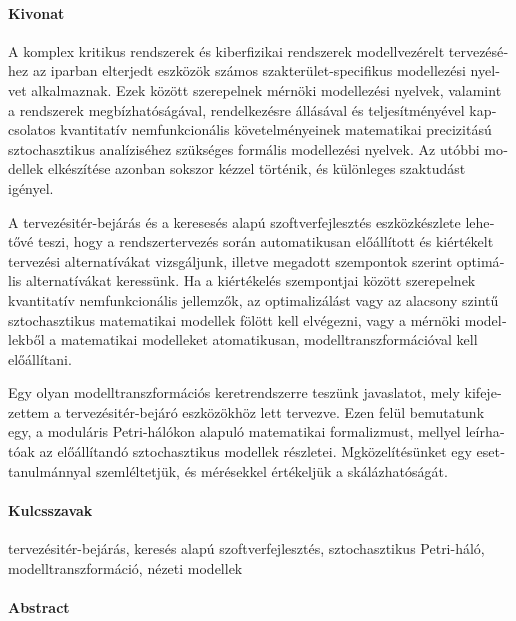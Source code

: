 \begin{otherlanguage}{magyar}
  \paragraph*{Kivonat}
  \thispagestyle{plain}
  
  A komplex kritikus rendszerek és kiberfizikai rendszerek modellvezérelt tervezéséhez az iparban elterjedt eszközök számos szakterület-specifikus modellezési nyelvet alkalmaznak. Ezek között szerepelnek mérnöki modellezési nyelvek, valamint a rendszerek megbízhatóságával, rendelkezésre állásával és teljesítményével kapcsolatos kvantitatív nemfunkcionális követelményeinek matematikai precizitású sztochasztikus analíziséhez szükséges formális modellezési nyelvek. Az utóbbi modellek elkészítése azonban sokszor kézzel történik, és különleges szaktudást igényel.

  A tervezésitér-bejárás és a keresesés alapú szoftverfejlesztés eszközkészlete lehetővé teszi, hogy a rendszertervezés során automatikusan előállított és kiértékelt tervezési alternatívákat vizsgáljunk, illetve megadott szempontok szerint optimális alternatívákat keressünk. Ha a kiértékelés szempontjai között szerepelnek kvantitatív nemfunkcionális jellemzők, az optimalizálást vagy az alacsony szintű sztochasztikus matematikai modellek fölött kell elvégezni, vagy a mérnöki modellekből a matematikai modelleket atomatikusan, modell\-transzformációval kell előállítani.

  Egy olyan modelltranszformációs keretrendszerre teszünk javaslatot, mely kifejezettem a tervezésitér-bejáró eszközökhöz lett tervezve. Ezen felül bemutatunk egy, a moduláris Petri-hálókon alapuló matematikai formalizmust, mellyel leírhatóak az előállítandó sztochasztikus modellek részletei. Mgközelítésünket egy esettanulmánnyal szemléltetjük, és mérésekkel értékeljük a skálázhatóságát.
  
  \paragraph{Kulcsszavak} tervezésitér-bejárás, keresés alapú szoftverfejlesztés, sztochasztikus Petri-háló, modelltranszformáció, nézeti modellek
\end{otherlanguage}

\vspace*{0pt plus 1fill}

\paragraph*{Abstract}
{}
\thispagestyle{plain}

